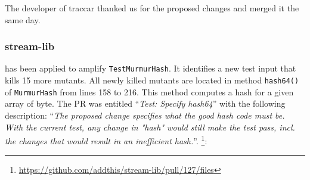The developer of traccar thanked us for the proposed changes and merged it the same day.


\subsubsection{stream-lib}



\dspot has been applied to amplify \texttt{TestMurmurHash}. 
It identifies a new test input that kills 15 more mutants.
All newly killed mutants are located in method \texttt{hash64()} of \texttt{MurmurHash} from lines 158 to 216.
 This method computes a hash for a given array of byte. 
 The PR was entitled ``\emph{Test: Specify hash64}'' with the following description: ``\emph{The proposed change specifies what the good hash code must be. With the current test, any change in "hash" would still make the test pass, incl. the changes that would result in an inefficient hash.}''. \footnote{\url{https://github.com/addthis/stream-lib/pull/127/files}}:
\begin{figure}[H]
	\centering{}
\end{figure}

